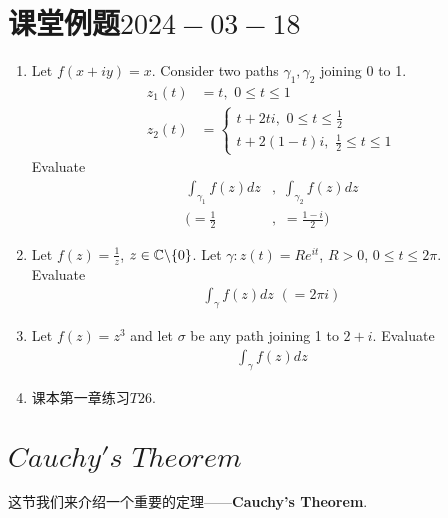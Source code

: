 \section{课堂例题$2024-03-18$}
\begin{enumerate}
	\item Let $f(x + iy) = x$. Consider two paths $\gamma_1 , \gamma_2$ joining 0 to 1.
	\begin{align}
		z_{1}(t) &= t , \,\, 0 \leq t \leq 1 \\
		z_{2}(t) &= 
		\begin{cases}
			t + 2t i , \,\, 0 \leq t \leq \frac{1}{2} \\
			t + 2(1 - t)i , \,\, \frac{1}{2} \leq t \leq 1
		\end{cases}
	\end{align}
	Evaluate
	\begin{align}
		\int_{\gamma_1}{f(z) dz} &, \,\, \int_{\gamma_2}{f(z) dz} \\
		( = \frac{1}{2} &, \,\, = \frac{1 - i}{2})
	\end{align}
	
	\vspace{2em}
	\item Let $f(z) = \frac{1}{z}$, $z \in \mathbb{C} \backslash \{ 0 \}$. Let $\gamma : z(t) = R e^{it}$, $R > 0$, $0 \leq t \leq 2\pi$.\\
	Evaluate
	\begin{align}
		\int_{\gamma}{f(z) dz} \,\, (= 2\pi i)
	\end{align}
	
	\vspace{2em}
	\item Let $f(z) = z^3$ and let $\sigma$ be any path joining 1 to $2 + i$. Evaluate
	\begin{align}
		\int_{\gamma}{f(z) dz}
	\end{align}
	
	\vspace{2em}
	\item 课本第一章练习$T26$.
\end{enumerate}

\newpage
\section{$Cauchy's \,\, Theorem$}
\begin{center}
	这节我们来介绍一个重要的定理——\textbf{Cauchy's Theorem}.
\end{center}

